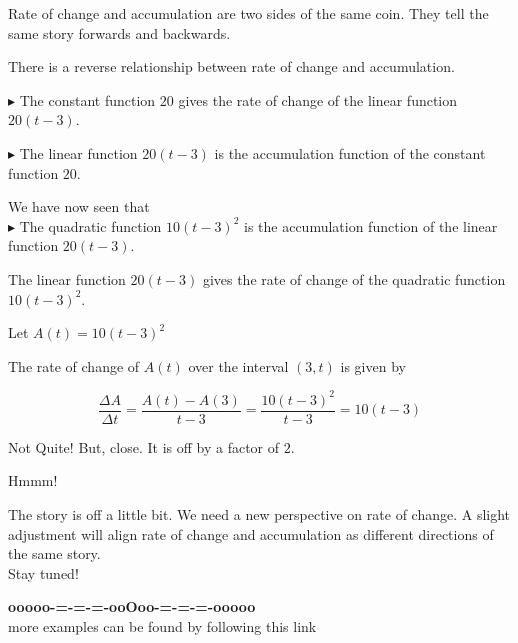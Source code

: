 \documentclass{ximera}
\begin{document}
Rate of change and accumulation are two sides of the same coin.  They tell the same story forwards and backwards.



There is a reverse relationship between rate of change and accumulation.


$\blacktriangleright$ The constant function $20$ gives the rate of change of the linear function $20(t-3)$.


$\blacktriangleright$ The linear function $20(t-3)$ is the accumulation function of the constant function $20$.




We have now seen that \\

$\blacktriangleright$ The quadratic function $10(t-3)^2$ is the accumulation function of the linear function $20(t-3)$. \\





\begin{claim}


The linear function $20(t-3)$ gives the rate of change of the quadratic function $10(t-3)^2$.



\begin{idea}


Let $A(t) = 10 (t-3)^2$


The rate of change of $A(t)$ over the interval $(3, t)$ is given by




\[
\frac{\Delta A}{\Delta t} = \frac{A(t) - A(3)}{t-3} = \frac{10 (t-3)^2}{t-3} = 10(t-3)
\]


Not Quite!  But, close.  It is off by a factor of $2$.  

\end{idea}


Hmmm!

\end{claim}














The story is off a little bit. We need a new perspective on rate of change.  A slight adjustment will align rate of change and accumulation as different directions of the same story. \\

Stay tuned!










\begin{center}
\textbf{\textcolor{green!50!black}{ooooo-=-=-=-ooOoo-=-=-=-ooooo}} \\

more examples can be found by following this link\\ 

\end{center}
\end{document}
